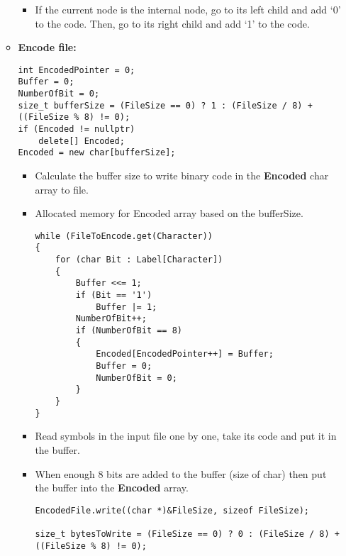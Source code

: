 \begin{enumerate}[label=\textbf{\Alph*.}]
\begin{itemize}
\begin{itemize}
            \item If the current node is the internal node, go to its left child and add ‘0’ to the code. Then, go to its right child and add ‘1’ to the code.
        \end{itemize}
        \item \textbf{Encode file:}
\begin{verbatim}
int EncodedPointer = 0;
Buffer = 0;
NumberOfBit = 0;
size_t bufferSize = (FileSize == 0) ? 1 : (FileSize / 8) + ((FileSize % 8) != 0);
if (Encoded != nullptr)
    delete[] Encoded;
Encoded = new char[bufferSize];
\end{verbatim}
        \begin{itemize}
            \item Calculate the buffer size to write binary code in the \textbf{Encoded} char array to file.
            \item Allocated memory for Encoded array based on the bufferSize.
            \newpage
\begin{verbatim}
while (FileToEncode.get(Character))
{
    for (char Bit : Label[Character]) 
    {
        Buffer <<= 1;
        if (Bit == '1')
            Buffer |= 1;
        NumberOfBit++; 
        if (NumberOfBit == 8)
        {
            Encoded[EncodedPointer++] = Buffer; 
            Buffer = 0;
            NumberOfBit = 0;
        }
    }
}
\end{verbatim}
            \item Read symbols in the input file one by one, take its code and put it in the buffer.
            \item When enough 8 bits are added to the buffer (size of char) then put the buffer into the \textbf{Encoded} array.
\begin{verbatim}
EncodedFile.write((char *)&FileSize, sizeof FileSize);

size_t bytesToWrite = (FileSize == 0) ? 0 : (FileSize / 8) + ((FileSize % 8) != 0);


\end{verbatim}
\end{itemize}
\end{itemize}
\end{enumerate}

